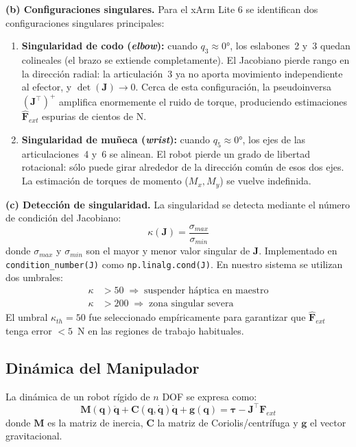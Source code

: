\documentclass[journal,10pt,twoside]{IEEEtran}
\begin{document}
\textbf{(b) Configuraciones singulares.}
Para el xArm Lite 6 se identifican dos configuraciones singulares
principales:
\begin{enumerate}[label=\roman*.]
  \item \textbf{Singularidad de codo (\textit{elbow}):} cuando
        $q_3 \approx 0°$, los eslabones~2 y~3 quedan colineales (el
        brazo se extiende completamente). El Jacobiano pierde rango en
        la dirección radial: la articulación~3 ya no aporta movimiento
        independiente al efector, y $\det(\bm{J}) \to 0$. Cerca de esta
        configuración, la pseudoinversa $(\bm{J}^\top)^+$ amplifica
        enormemente el ruido de torque, produciendo estimaciones
        $\hat{\bm{F}}_{ext}$ espurias de cientos de N.
  \item \textbf{Singularidad de muñeca (\textit{wrist}):} cuando
        $q_5 \approx 0°$, los ejes de las articulaciones~4 y~6 se
        alinean. El robot pierde un grado de libertad rotacional:
        sólo puede girar alrededor de la dirección común de esos dos
        ejes. La estimación de torques de momento ($M_x, M_y$) se
        vuelve indefinida.
\end{enumerate}


\textbf{(c) Detección de singularidad.}
La singularidad se detecta mediante el número de condición del
Jacobiano:
\begin{equation}
  \kappa(\bm{J}) = \frac{\sigma_{max}}{\sigma_{min}}
  \label{eq:kappa}
\end{equation}
donde $\sigma_{max}$ y $\sigma_{min}$ son el mayor y menor valor
singular de $\bm{J}$. Implementado en \texttt{condition\_number(J)}
como \texttt{np.linalg.cond(J)}. En nuestro sistema se utilizan dos
umbrales:
\begin{align*}
  \kappa &> 50  \;\Rightarrow\; \text{suspender háptica en maestro} \\
  \kappa &> 200 \;\Rightarrow\; \text{zona singular severa}
\end{align*}
El umbral $\kappa_{th} = 50$ fue seleccionado empíricamente para
garantizar que $\hat{\bm{F}}_{ext}$ tenga error $< 5$~N en las
regiones de trabajo habituales.

\subsection{Dinámica del Manipulador}

La dinámica de un robot rígido de $n$ DOF se expresa como:
\begin{equation}
  \bm{M}(\bm{q})\ddot{\bm{q}} + \bm{C}(\bm{q},\dot{\bm{q}})\dot{\bm{q}}
  + \bm{g}(\bm{q}) = \bm{\tau} - \bm{J}^\top\bm{F}_{ext}
  \label{eq:dynamics}
\end{equation}
donde $\bm{M}$ es la matriz de inercia, $\bm{C}$ la matriz de
Coriolis/centrífuga y $\bm{g}$ el vector gravitacional.
\end{document}
